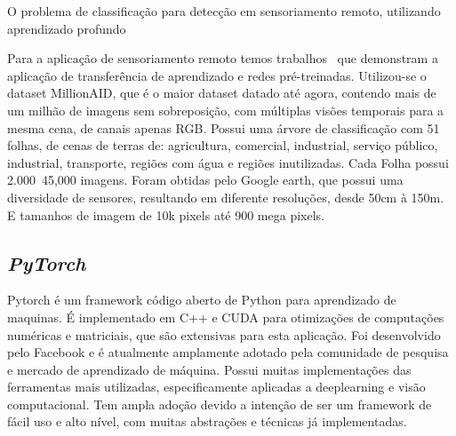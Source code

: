 O problema de classificação para detecção em sensoriamento remoto, utilizando aprendizado profundo~\cite{s20236936}


Para a aplicação de sensoriamento remoto temos trabalhos~\cite{wang2022empirical} que demonstram a aplicação de transferência de aprendizado e redes pré-treinadas. Utilizou-se o dataset MillionAID, que é o maior dataset datado até agora, contendo mais de um milhão de imagens sem sobreposição, com múltiplas visões temporais para a mesma cena, de canais apenas RGB. Possui uma árvore de classificação com 51 folhas, de cenas de terras de: agricultura, comercial, industrial, serviço público, industrial, transporte, regiões com água e regiões inutilizadas. Cada Folha possui 2.000~45,000 imagens. Foram obtidas pelo Google earth, que possui uma diversidade de sensores, resultando em diferente resoluções, desde 50cm à 150m. E tamanhos de imagem de 10k pixels até 900 mega pixels.




\subsection{\textit{PyTorch}}\label{sec:Cap2_PyTorch}
Pytorch é um framework código aberto de Python para aprendizado de maquinas. É implementado em C++ e CUDA para otimizações de computações numéricas e matriciais, que são extensivas para esta aplicação.
Foi desenvolvido pelo Facebook e é atualmente amplamente adotado pela comunidade de pesquisa e mercado de aprendizado de máquina. Possui muitas implementações das ferramentas mais utilizadas, especificamente aplicadas a deeplearning e visão computacional. Tem ampla adoção devido a intenção de ser um framework de fácil uso e alto nível, com muitas abstrações e técnicas já implementadas.







